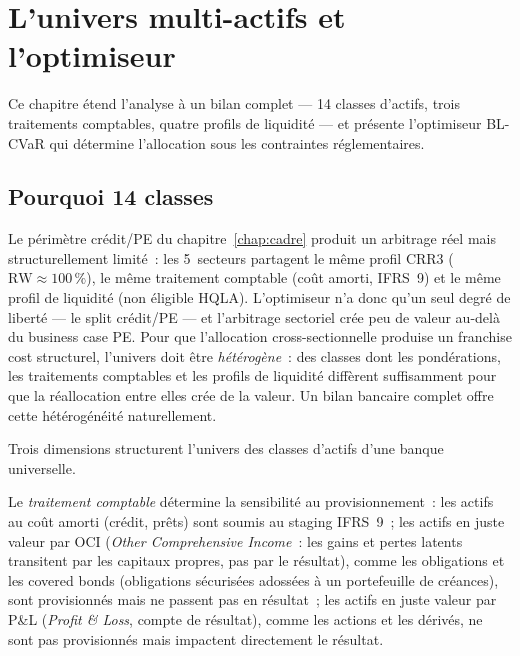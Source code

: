 \documentclass[10pt, a4paper, oneside]{report}
\theoremstyle{definition}
\begin{document}

\chapter{L'univers multi-actifs et l'optimiseur}
\label{chap:multi-actifs}

Ce chapitre étend l'analyse à un bilan complet --- 14 classes d'actifs, trois traitements comptables, quatre profils de liquidité --- et présente l'optimiseur BL-CVaR qui détermine l'allocation sous les contraintes réglementaires.


\section{Pourquoi 14 classes}
\label{sec:ch3:pourquoi}

Le périmètre crédit/PE du chapitre~\ref{chap:cadre} produit un arbitrage réel mais structurellement limité~: les 5~secteurs partagent le même profil CRR3 ($\text{RW} \approx 100\,\%$), le même traitement comptable (coût amorti, IFRS~9) et le même profil de liquidité (non éligible HQLA). L'optimiseur n'a donc qu'un seul degré de liberté --- le split crédit/PE --- et l'arbitrage sectoriel crée peu de valeur au-delà du business case PE. Pour que l'allocation cross-sectionnelle produise un franchise cost structurel, l'univers doit être \emph{hétérogène}~: des classes dont les pondérations, les traitements comptables et les profils de liquidité diffèrent suffisamment pour que la réallocation entre elles crée de la valeur. Un bilan bancaire complet offre cette hétérogénéité naturellement.

Trois dimensions structurent l'univers des classes d'actifs d'une banque universelle.

Le \emph{traitement comptable} détermine la sensibilité au provisionnement~: les actifs au coût amorti (crédit, prêts) sont soumis au staging IFRS~9~; les actifs en juste valeur par OCI (\emph{Other Comprehensive Income}~: les gains et pertes latents transitent par les capitaux propres, pas par le résultat), comme les obligations et les covered bonds (obligations sécurisées adossées à un portefeuille de créances), sont provisionnés mais ne passent pas en résultat~; les actifs en juste valeur par P\&L (\emph{Profit \& Loss}, compte de résultat), comme les actions et les dérivés, ne sont pas provisionnés mais impactent directement le résultat.
\end{document}
